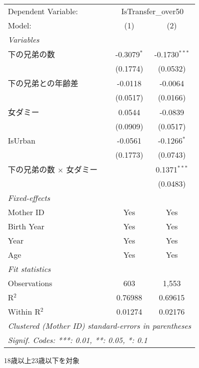 \documentclass{article}
\begin{document}
\begingroup
\centering
\begin{threeparttable}[b]
   \begin{tabular}{lcc}
      \tabularnewline \midrule \midrule
      Dependent Variable: & \multicolumn{2}{c}{IsTransfer\_over50}\\
      Model:                          & (1)           & (2)\\  
      \midrule
      \emph{Variables}\\
      下の兄弟の数                    & -0.3079$^{*}$ & -0.1730$^{***}$\\   
                                      & (0.1774)      & (0.0532)\\   
      下の兄弟との年齢差              & -0.0118       & -0.0064\\   
                                      & (0.0517)      & (0.0166)\\   
      女ダミー                        & 0.0544        & -0.0839\\   
                                      & (0.0909)      & (0.0517)\\   
      IsUrban                         & -0.0561       & -0.1266$^{*}$\\   
                                      & (0.1773)      & (0.0743)\\   
      下の兄弟の数 $\times$ 女ダミー  &               & 0.1371$^{***}$\\   
                                      &               & (0.0483)\\   
      \midrule
      \emph{Fixed-effects}\\
      Mother ID                       & Yes           & Yes\\  
      Birth Year                      & Yes           & Yes\\  
      Year                            & Yes           & Yes\\  
      Age                             & Yes           & Yes\\  
      \midrule
      \emph{Fit statistics}\\
      Observations                    & 603           & 1,553\\  
      R$^2$                           & 0.76988       & 0.69615\\  
      Within R$^2$                    & 0.01274       & 0.02176\\  
      \midrule \midrule
      \multicolumn{3}{l}{\emph{Clustered (Mother ID) standard-errors in parentheses}}\\
      \multicolumn{3}{l}{\emph{Signif. Codes: ***: 0.01, **: 0.05, *: 0.1}}\\
   \end{tabular}
   
   \begin{tablenotes}\item 18歳以上23歳以下を対象
   \end{tablenotes}
\end{threeparttable}
\par\endgroup
\end{document}
